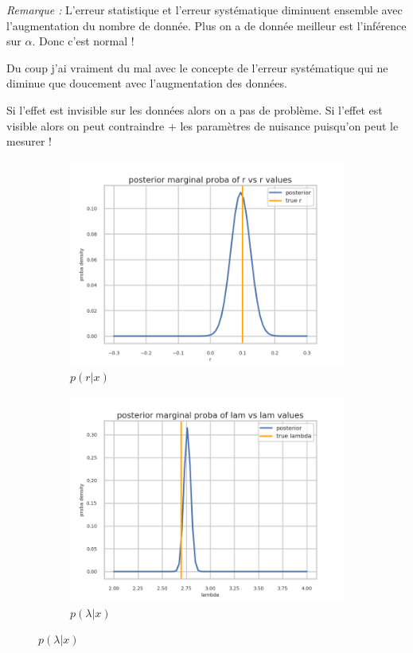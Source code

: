 \emph{Remarque :}
L'erreur statistique et l'erreur systématique diminuent ensemble avec l'augmentation du nombre de donnée.
Plus on a de donnée meilleur est l'inférence sur $\alpha$.
Donc c'est normal !

Du coup j'ai vraiment du mal avec le concepte de l'erreur systématique qui ne diminue que doucement avec l'augmentation des données.

Si l'effet est invisible sur les données alors on a pas de problème.
Si l'effet est visible alors on peut contraindre + les paramètres de nuisance puisqu'on peut le mesurer !


\begin{figure}[htb]
  \centering
  \begin{subfigure}[t]{0.49\linewidth}
    \includegraphics[width=\linewidth]{s3d2/marginal_r.png}
    \caption{$p(r|x)$}
    \label{fig:marginal_r}
  \end{subfigure}%
  \hfill
  \begin{subfigure}[t]{0.49\linewidth}
    \includegraphics[width=\linewidth]{s3d2/marginal_lam.png}
    \caption{$p(\lambda|x)$}
    \label{fig:marginal_lambda}
  \end{subfigure}


\end{figure}
